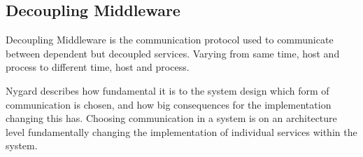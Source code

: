 \subsection{Decoupling Middleware}
Decoupling Middleware is the communication protocol used to communicate between dependent but decoupled services. Varying from same time, host and process to different time, host and process.

Nygard describes how fundamental it is to the system design which form of communication is chosen, and how big consequences for the implementation changing this has. Choosing communication in a system is on an architecture level fundamentally changing the implementation of individual services within the system.